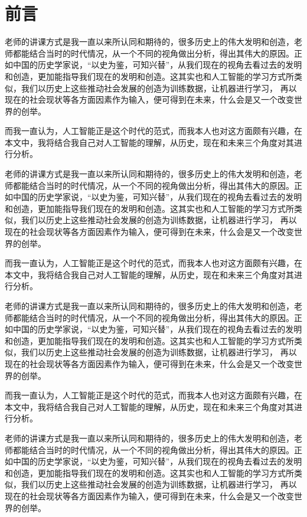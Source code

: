 \documentclass[UTF8]{XJTUthesis}
\begin{document}
\section{前言}
老师的讲课方式是我一直以来所认同和期待的，很多历史上的伟大发明和创造，老师都能结合当时的时代情况，从一个不同的视角做出分析，得出其伟大的原因。正如中国的历史学家说，“以史为鉴，可知兴替”，从我们现在的视角去看过去的发明和创造，更加能指导我们现在的发明和创造。这其实也和人工智能的学习方式所类似，我们以历史上这些推动社会发展的创造为训练数据，让机器进行学习， 再以现在的社会现状等各方面因素作为输入，便可得到在未来，什么会是又一个改变世界的创举。\par
而我一直认为，人工智能正是这个时代的范式，而我本人也对这方面颇有兴趣，在本文中，我将结合我自己对人工智能的理解，从历史，现在和未来三个角度对其进行分析。\par
老师的讲课方式是我一直以来所认同和期待的，很多历史上的伟大发明和创造，老师都能结合当时的时代情况，从一个不同的视角做出分析，得出其伟大的原因。正如中国的历史学家说，“以史为鉴，可知兴替”，从我们现在的视角去看过去的发明和创造，更加能指导我们现在的发明和创造。这其实也和人工智能的学习方式所类似，我们以历史上这些推动社会发展的创造为训练数据，让机器进行学习， 再以现在的社会现状等各方面因素作为输入，便可得到在未来，什么会是又一个改变世界的创举。\par
而我一直认为，人工智能正是这个时代的范式，而我本人也对这方面颇有兴趣，在本文中，我将结合我自己对人工智能的理解，从历史，现在和未来三个角度对其进行分析。\par
老师的讲课方式是我一直以来所认同和期待的，很多历史上的伟大发明和创造，老师都能结合当时的时代情况，从一个不同的视角做出分析，得出其伟大的原因。正如中国的历史学家说，“以史为鉴，可知兴替”，从我们现在的视角去看过去的发明和创造，更加能指导我们现在的发明和创造。这其实也和人工智能的学习方式所类似，我们以历史上这些推动社会发展的创造为训练数据，让机器进行学习， 再以现在的社会现状等各方面因素作为输入，便可得到在未来，什么会是又一个改变世界的创举。\par
而我一直认为，人工智能正是这个时代的范式，而我本人也对这方面颇有兴趣，在本文中，我将结合我自己对人工智能的理解，从历史，现在和未来三个角度对其进行分析。\par
老师的讲课方式是我一直以来所认同和期待的，很多历史上的伟大发明和创造，老师都能结合当时的时代情况，从一个不同的视角做出分析，得出其伟大的原因。正如中国的历史学家说，“以史为鉴，可知兴替”，从我们现在的视角去看过去的发明和创造，更加能指导我们现在的发明和创造。这其实也和人工智能的学习方式所类似，我们以历史上这些推动社会发展的创造为训练数据，让机器进行学习， 再以现在的社会现状等各方面因素作为输入，便可得到在未来，什么会是又一个改变世界的创举。\par
\end{document}
